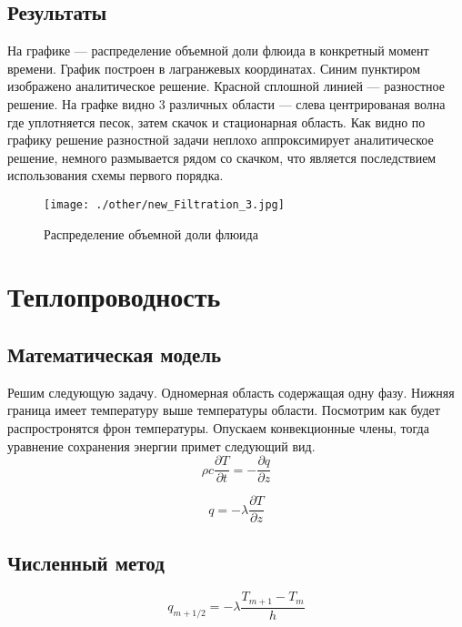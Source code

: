 \documentclass[12pt,a4paper]{article}
\newcommand{\pd}[2]{\frac{\partial #1}{\partial #2}}
\begin{document}
\subsection{Результаты}
На графике --- распределение объемной доли флюида в конкретный момент времени. График построен в лагранжевых координатах. Синим пунктиром изображено аналитическое решение. Красной сплошной линией --- разностное решение. На графке видно 3 различных области --- слева центрированая волна где уплотняется песок, затем скачок и стационарная область. Как видно по графику решение разностной задачи неплохо аппроксимирует аналитическое решение, немного размывается рядом со скачком, что является последствием использования схемы первого порядка.
\begin{figure}[h!]
\begin{center}
\texttt{[image: ./other/new\_Filtration\_3.jpg]}
\caption{Распределение объемной доли флюида}
\end{center}
\end{figure}

\newpage
\section{Теплопроводность}
\subsection{Математическая модель}
Решим следующую задачу. Одномерная область содержащая одну фазу. Нижняя граница имеет температуру выше температуры области. Посмотрим как будет распростронятся фрон температуры. Опускаем конвекционные члены, тогда уравнение сохранения энергии примет следующий вид.
\begin{equation}
\rho c \pd{T}{t} = - \pd{q}{z}
\label{termal_1}
\end{equation}

\begin{equation}
q = - \lambda\pd{T}{z}
\label{termal_2}
\end{equation}

\subsection{Численный метод}
\begin{equation}
q_{m+1/2} = - \lambda\frac{T_{m+1} - T_m}{h}
\label{termal_razn_1}
\end{equation}
\end{document}
